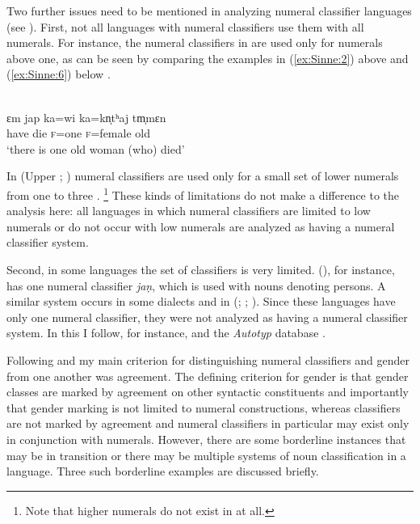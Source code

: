 \documentclass[output=collectionpaper]{langsci/langscibook}
\begin{document}
Two further issues need to be mentioned in analyzing numeral classifier languages (see \citealt{Gil2013}). First, not all languages with numeral classifiers use them with all numerals. For instance, the numeral classifiers in  are used only for numerals above one, as can be seen by comparing the examples in (\ref{ex:Sinne:2}) above and (\ref{ex:Sinne:6}) below \citep[108]{Ring2015}.

\ea\label{ex:Sinne:6}
\\
\gll ɛm jap ka=wi ka=kn̩tʰaj tm̩mɛn\\
have die \textsc{f=}one \textsc{f}=female old\\
\glt `there is one old woman (who) died'
\z

In  (Upper ; ) numeral classifiers are used only for a small set of lower numerals from one to three \citep[56--57]{Lock2011}.%
\footnote{Note that higher numerals do not exist in  at all.} %
These kinds of limitations do not make a difference to the analysis here: all languages in which numeral classifiers are limited to low numerals or do not occur with low numerals are analyzed as having a numeral classifier system.

Second, in some languages the set of classifiers is very limited.  (), for instance, has one numeral classifier \textit{jaṇ}, which is used with nouns denoting persons. A similar system occurs in some  dialects and in  (; ; \citealt[11--12]{Emeneau1956}). Since these languages have only one numeral classifier, they were not analyzed as having a numeral classifier system. In this I follow, for instance, \citet{Nichols1992} and the \textit{Autotyp} database \citep{Bickel2017}.

\largerpage
Following \citet[129, 132]{Nichols1992} and \citet[4--5]{Corbett1991} my main criterion for distinguishing numeral classifiers and gender from one another was agreement. The defining criterion for gender is that gender classes are marked by agreement on other syntactic constituents \textendash{} and importantly that gender marking is not limited to numeral constructions, whereas classifiers are not marked by agreement and numeral classifiers in particular may exist only in conjunction with numerals. However, there are some borderline instances that may be in transition or there may be multiple systems of noun classification in a language. Three such borderline examples are discussed briefly.
\end{document}
